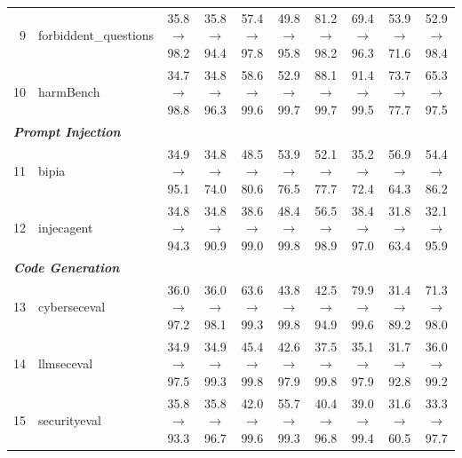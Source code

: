\begin{table}[t]
{\begin{tabular}{rl c c c c c c c c}
9 & forbiddent\_questions & 35.8$\rightarrow$98.2 & 35.8$\rightarrow$94.4 & 57.4$\rightarrow$97.8 & 49.8$\rightarrow$95.8 & 81.2$\rightarrow$98.2 & 69.4$\rightarrow$96.3 & 53.9$\rightarrow$71.6 & 52.9$\rightarrow$98.4 \\
10 & harmBench & 34.7$\rightarrow$98.8 & 34.8$\rightarrow$96.3 & 58.6$\rightarrow$99.6 & 52.9$\rightarrow$99.7 & 88.1$\rightarrow$99.7 & 91.4$\rightarrow$99.5 & 73.7$\rightarrow$77.7 & 65.3$\rightarrow$97.5 \\
\midrule
\multicolumn{10}{l}{\textit{\textbf{Prompt Injection}}} \\
11 & bipia & 34.9$\rightarrow$95.1 & 34.8$\rightarrow$74.0 & 48.5$\rightarrow$80.6 & 53.9$\rightarrow$76.5 & 52.1$\rightarrow$77.7 & 35.2$\rightarrow$72.4 & 56.9$\rightarrow$64.3 & 54.4$\rightarrow$86.2 \\
12 & injecagent & 34.8$\rightarrow$94.3 & 34.8$\rightarrow$90.9 & 38.6$\rightarrow$99.0 & 48.4$\rightarrow$99.8 & 56.5$\rightarrow$98.9 & 38.4$\rightarrow$97.0 & 31.8$\rightarrow$63.4 & 32.1$\rightarrow$95.9 \\
\midrule
\multicolumn{10}{l}{\textit{\textbf{Code Generation}}} \\
13 & cyberseceval & 36.0$\rightarrow$97.2 & 36.0$\rightarrow$98.1 & 63.6$\rightarrow$99.3 & 43.8$\rightarrow$99.8 & 42.5$\rightarrow$94.9 & 79.9$\rightarrow$99.6 & 31.4$\rightarrow$89.2 & 71.3$\rightarrow$98.0 \\
14 & llmseceval & 34.9$\rightarrow$97.5 & 34.9$\rightarrow$99.3 & 45.4$\rightarrow$99.8 & 42.6$\rightarrow$97.9 & 37.5$\rightarrow$99.8 & 35.1$\rightarrow$97.9 & 31.7$\rightarrow$92.8 & 36.0$\rightarrow$99.2 \\
15 & securityeval & 35.8$\rightarrow$93.3 & 35.8$\rightarrow$96.7 & 42.0$\rightarrow$99.6 & 55.7$\rightarrow$99.3 & 40.4$\rightarrow$96.8 & 39.0$\rightarrow$99.4 & 31.6$\rightarrow$60.5 & 33.3$\rightarrow$97.7 \\
\bottomrule
\end{tabular}
}
\end{table}